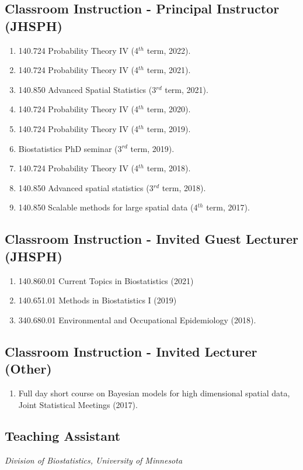 \documentclass[12pt]{article}
\newcommand{\mydot}[1]{\begin{enumerate}[label=$\circ$,leftmargin=\parindent]\setlength{\itemsep}{#1}}
\newcommand{\ee}{\end{enumerate}}
\newcommand{\mylift}[1]{\vspace*{#1}}
\begin{document}
\subsection*{Classroom Instruction - Principal Instructor (JHSPH)}
\mydot{-0.1em}
\item 140.724 Probability Theory IV (4$^{th}$ term, 2022).
\item 140.724 Probability Theory IV (4$^{th}$ term, 2021).
\item 140.850 Advanced Spatial Statistics (3$^{rd}$ term, 2021). 
\item 140.724 Probability Theory IV (4$^{th}$ term, 2020).
\item 140.724 Probability Theory IV (4$^{th}$ term, 2019).
\item Biostatistics PhD seminar (3$^{rd}$ term, 2019).
\item 140.724 Probability Theory IV (4$^{th}$ term, 2018).
\item 140.850 Advanced spatial statistics (3$^{rd}$ term, 2018).
\item 140.850 Scalable methods for large spatial data (4$^{th}$ term, 2017).

\ee

\mylift{-1.5em}

\subsection*{Classroom Instruction - Invited Guest Lecturer (JHSPH)}

\mydot{-0.1em}
\item 140.860.01 Current Topics in Biostatistics (2021)
\item 140.651.01 Methods in Biostatistics I (2019)
\item 340.680.01 Environmental and Occupational Epidemiology (2018).

\ee

\mylift{-1.5em}

\subsection*{Classroom Instruction - Invited Lecturer (Other)}

\mydot{-0.1em}

\item Full day short course on Bayesian models for high dimensional spatial data, Joint Statistical Meetings (2017). 

\ee


\subsection*{Teaching Assistant}
\vskip -2mm {\em Division of Biostatistics, University of Minnesota} 
\end{document}
